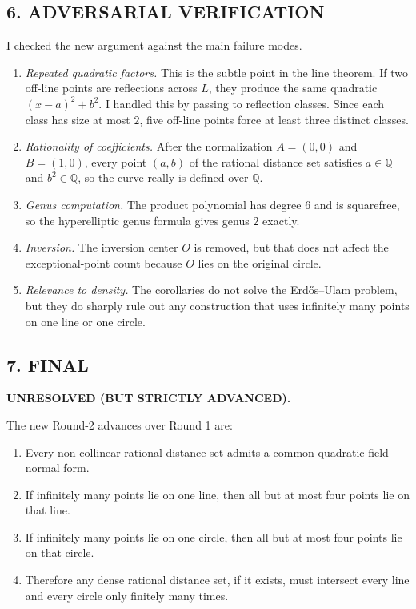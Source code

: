 \subsection*{6. ADVERSARIAL VERIFICATION}
I checked the new argument against the main failure modes.
\begin{enumerate}
\item \emph{Repeated quadratic factors.} This is the subtle point in the line theorem. If two off-line points are reflections across $L$, they produce the same quadratic $(x-a)^2+b^2$. I handled this by passing to reflection classes. Since each class has size at most $2$, five off-line points force at least three distinct classes.
\item \emph{Rationality of coefficients.} After the normalization $A=(0,0)$ and $B=(1,0)$, every point $(a,b)$ of the rational distance set satisfies $a\in \mathbb{Q}$ and $b^2\in \mathbb{Q}$, so the curve really is defined over $\mathbb{Q}$.
\item \emph{Genus computation.} The product polynomial has degree $6$ and is squarefree, so the hyperelliptic genus formula gives genus $2$ exactly.
\item \emph{Inversion.} The inversion center $O$ is removed, but that does not affect the exceptional-point count because $O$ lies on the original circle.
\item \emph{Relevance to density.} The corollaries do not solve the Erd\H{o}s--Ulam problem, but they do sharply rule out any construction that uses infinitely many points on one line or one circle.
\end{enumerate}

\subsection*{7. FINAL}
\textbf{UNRESOLVED (BUT STRICTLY ADVANCED).}

The new Round-2 advances over Round 1 are:
\begin{enumerate}
\item Every non-collinear rational distance set admits a common quadratic-field normal form.
\item If infinitely many points lie on one line, then all but at most four points lie on that line.
\item If infinitely many points lie on one circle, then all but at most four points lie on that circle.
\item Therefore any dense rational distance set, if it exists, must intersect every line and every circle only finitely many times.
\end{enumerate}

